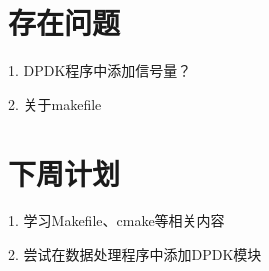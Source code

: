 \documentclass{article}
\begin{document}
\section{存在问题}
1. DPDK程序中添加信号量？

2. 关于makefile

\section{下周计划}
1. 学习Makefile、cmake等相关内容

2. 尝试在数据处理程序中添加DPDK模块
\end{document}
